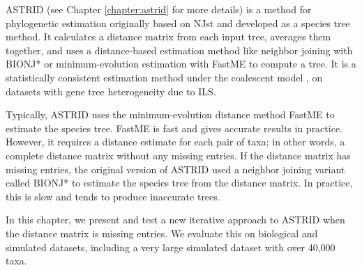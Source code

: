 


ASTRID \cite{vachaspati2015astrid} (see Chapter \ref{chapter:astrid} for more details) is a method for phylogenetic estimation originally based on NJst \cite{liu2011estimating} and developed as a species tree method. It calculates a distance matrix from each input tree, averages them together, and uses a distance-based estimation method like neighbor joining with BIONJ* \cite{phydstar} or minimum-evolution estimation with FastME \cite{lefort2015fastme} to compute a tree. It is a statistically consistent estimation method under the coalescent model \cite{maddison1997gene}, on datasets with gene tree heterogeneity due to ILS.

Typically, ASTRID uses the minimum-evolution distance method FastME to estimate the species tree. FastME is fast and gives accurate results in practice. However, it requires a distance estimate for each pair of taxa; in other words, a complete distance matrix without any missing entries. If the distance matrix has missing entries, the original version of ASTRID used a neighbor joining variant called BIONJ* to estimate the species tree from the distance matrix. In practice, this is slow and tends to produce inaccurate trees. 

In this chapter, we present and test a new iterative approach to ASTRID when the distance matrix is missing entries. We evaluate this on biological and simulated datasets, including a very large simulated dataset with over 40,000 taxa.

